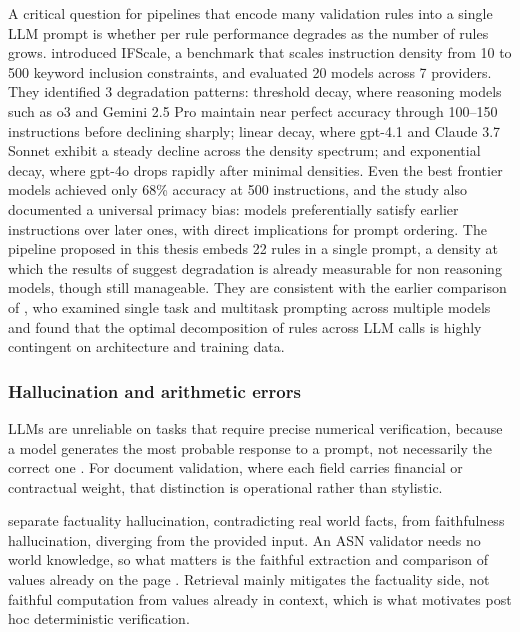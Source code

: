 A critical question for pipelines that encode many validation rules into a single LLM prompt is whether per rule performance degrades as the number of rules grows. \citet{jaroslawicz2025} introduced IFScale, a benchmark that scales instruction density from 10 to 500 keyword inclusion constraints, and evaluated 20 models across 7 providers. They identified 3 degradation patterns: threshold decay, where reasoning models such as o3 and Gemini 2.5 Pro maintain near perfect accuracy through 100--150 instructions before declining sharply; linear decay, where gpt-4.1 and Claude 3.7 Sonnet exhibit a steady decline across the density spectrum; and exponential decay, where gpt-4o drops rapidly after minimal densities. Even the best frontier models achieved only 68\% accuracy at 500 instructions, and the study also documented a universal primacy bias: models preferentially satisfy earlier instructions over later ones, with direct implications for prompt ordering. The pipeline proposed in this thesis embeds 22 rules in a single prompt, a density at which the results of \citet{jaroslawicz2025} suggest degradation is already measurable for non reasoning models, though still manageable. They are consistent with the earlier comparison of \citet{gozzi2024}, who examined single task and multitask prompting across multiple models and found that the optimal decomposition of rules across LLM calls is highly contingent on architecture and training data.

\subsubsection{Hallucination and arithmetic errors}
\label{sec:lr:hallucination}

LLMs are unreliable on tasks that require precise numerical verification, because a model generates the most probable response to a prompt, not necessarily the correct one \citep{feuerriegel2024}. For document validation, where each field carries financial or contractual weight, that distinction is operational rather than stylistic.

\citet{huang2024hallucination} separate factuality hallucination, contradicting real world facts, from faithfulness hallucination, diverging from the provided input. An ASN validator needs no world knowledge, so what matters is the faithful extraction and comparison of values already on the page \citep{ji2023}. Retrieval mainly mitigates the factuality side, not faithful computation from values already in context, which is what motivates post hoc deterministic verification.

